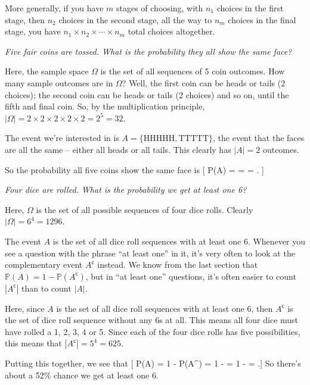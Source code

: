 \documentclass[
  letterpaper,
  DIV=11,
  numbers=noendperiod]{scrreprt}
\theoremstyle{remark}
\begin{document}
More generally, if you have \(m\) stages of choosing, with \(n_1\)
choices in the first stage, then \(n_2\) choices in the second stage,
all the way to \(n_m\) choices in the final stage, you have
\(n_1 \times n_2 \times \cdots \times n_m\) total choices altogether.

\emph{Five fair coins are tossed. What is the probability they all show
the same face?}

Here, the sample space \(\Omega\) is the set of all sequences of 5 coin
outcomes. How many sample outcomes are in \(\Omega\)? Well, the first
coin can be heads or tails (2 choices); the second coin can be heads or
tails (2 choices) and so on, until the fifth and final coin. So, by the
multiplication principle,
\(|\Omega| = 2 \times 2 \times 2 \times 2 \times 2 = 2^5 = 32\).

The event we're interested in is \(A = \{\text{HHHHH}, \text{TTTTT}\}\),
the event that the faces are all the same -- either all heads or all
tails. This clearly has \(|A| = 2\) outcomes.

So the probability all five coins show the same face is {[} \mathbb P(A)
=  =  =  . {]}

\emph{Four dice are rolled. What is the probability we get at least one
6?}

Here, \(\Omega\) is the set of all possible sequences of four dice
rolls. Clearly \(|\Omega| = 6^4 = 1296\).

The event \(A\) is the set of all dice roll sequences with at least one
6. Whenever you see a question with the phrase ``at least one'' in it,
it's very often to look at the complementary event \(A^\mathsf{c}\)
instead. We know from the last section that
\(\mathbb P(A) = 1 - \mathbb P(A^\mathsf{c})\), but in ``at least one''
questions, it's often easier to count \(|A^\mathsf{c}|\) than to count
\(|A|\).

Here, since \(A\) is the set of all dice roll sequences with at least
one 6, then \(A^\mathsf{c}\) is the set of dice roll sequence without
any 6s at all. This means all four dice must have rolled a 1, 2, 3, 4 or
5. Since each of the four dice rolls has five possibilities, this means
that \(|A^\mathsf{c}| = 5^4 = 625\).

Putting this together, we see that {[} \mathbb P(A) = 1 -
\mathbb P(A\^{}) = 1 -  = 1 -
 =   .{]} So there's about
a 52\% chance we get at least one 6.
\end{document}
